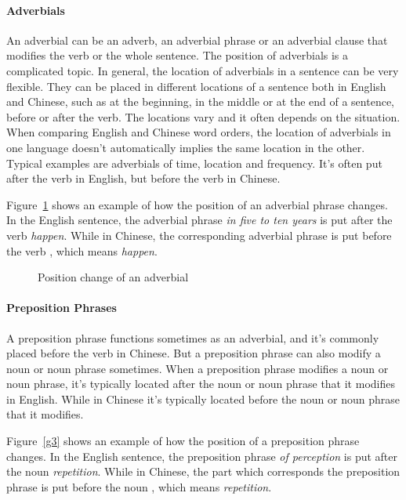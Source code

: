 \paragraph{Adverbials}
An adverbial can be an adverb, an adverbial phrase or an adverbial clause that modifies the verb or the whole sentence. The position of adverbials is a complicated topic. In general, the location of adverbials in a sentence can be very flexible. They can be placed in different locations of a sentence both in English and Chinese, such as at the beginning, in the middle or at the end of a sentence, before or after the verb. The locations vary and it often depends on the situation. When comparing English and Chinese word orders, the location of adverbials in one language doesn't automatically implies the same location in the other. Typical examples are adverbials of time, location and frequency. It's often put after the verb in English, but before the verb in Chinese. 

Figure~\ref{g2} shows an example of how the position of an adverbial phrase changes. In the English sentence, the adverbial phrase \emph{in five to ten years} is put after the verb \emph{happen}. While in Chinese, the corresponding adverbial phrase  is put before the verb , which means \emph{happen}.

\begin{figure}[H]
\centering

\caption{Position change of an adverbial}
\label{g2}
\end{figure}

\paragraph{Preposition Phrases}
A preposition phrase functions sometimes as an adverbial, and it's commonly placed before the verb in Chinese. But a preposition phrase can also modify a noun or noun phrase sometimes. When a preposition phrase modifies a noun or noun phrase, it's typically located after the noun or noun phrase that it modifies in English. While in Chinese it's typically located before the noun or noun phrase that it modifies.

Figure~\ref{g3} shows an example of how the position of a preposition phrase changes. In the English sentence, the preposition phrase \emph{of perception} is put after the noun \emph{repetition}. While in Chinese, the part  which corresponds the preposition phrase is put before the noun , which means \emph{repetition}.

